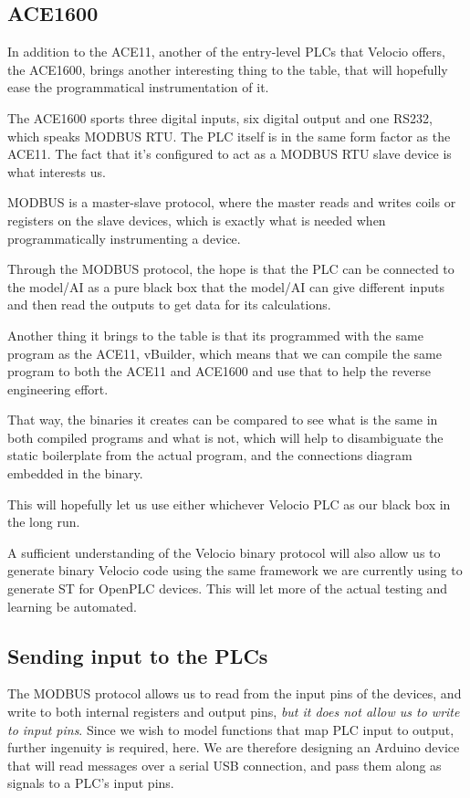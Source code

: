 \documentclass[11pt]{article}
\begin{document}
\subsection{ACE1600}
\label{sec:orgf138101}

In addition to the ACE11, another of the entry-level PLCs that Velocio offers, the ACE1600, brings another interesting thing to the table, that will hopefully ease the programmatical instrumentation of it.

The ACE1600 sports three digital inputs, six digital output and one RS232, which speaks MODBUS RTU. The PLC itself is in the same form factor as the ACE11. The fact that it's configured to act as a MODBUS RTU slave device is what interests us.

MODBUS is a master-slave protocol, where the master reads and writes coils or registers on the slave devices, which is exactly what is needed when programmatically instrumenting a device.

Through the MODBUS protocol, the hope is that the PLC can be connected to the model/AI as a pure black box that the model/AI can give different inputs and then read the outputs to get data for its calculations.

Another thing it brings to the table is that its programmed with the same program as the ACE11, vBuilder, which means that we can compile the same program to both the ACE11 and ACE1600 and use that to help the reverse engineering effort.

That way, the binaries it creates can be compared to see what is the same in both compiled programs and what is not, which will help to disambiguate the static boilerplate from the actual program, and the connections diagram embedded in the binary.

This will hopefully let us use either whichever Velocio PLC as our black box in the long run.

A sufficient understanding of the Velocio binary protocol will also allow us to generate binary Velocio code using the same framework we are currently using to generate ST for OpenPLC devices. This will let more of the actual testing and learning be automated.




\subsection{Sending input to the PLCs}
\label{sec:orgbabc7e7}

The MODBUS protocol allows us to read from the input pins of the devices, and write to both internal registers and output pins, \emph{but it does not allow us to write to input pins}. Since we wish to model functions that map PLC input to output, further ingenuity is required, here. We are therefore designing an Arduino device that will read messages over a serial USB connection, and pass them along as signals to a PLC's input pins. 
\end{document}
